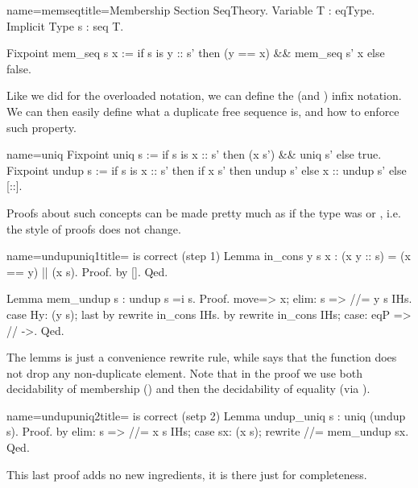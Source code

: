 \begin{coq}{name=memseq}{title=Membership}
Section SeqTheory.
Variable T : eqType.
Implicit Type s : seq T.

Fixpoint mem_seq s x :=
  if s is y :: s' then (y == x) && mem_seq s' x else false.
\end{coq}

Like we did for the overloaded \C{==} notation, we can define the
\C{\\in} (and \C{\\notin}) infix notation.  We can then easily
define what a duplicate free sequence is, and how to enforce such
property.

\begin{coq}{name=uniq}{}
Fixpoint uniq s :=
  if s is x :: s' then (x \notin s') && uniq s' else true.
Fixpoint undup s :=
  if s is x :: s' then
    if x \in s' then undup s' else x :: undup s'
  else [::].
\end{coq}

Proofs about such concepts can be made pretty much as if
the type  was  or , i.e. the style of proofs
does not change.

\begin{coq}{name=undupuniq1}{title= is correct (step 1)}
Lemma in_cons y s x : (x \in y :: s) = (x == y) || (x \in s).
Proof. by []. Qed.

Lemma mem_undup s : undup s =i s.
Proof.
move=> x; elim: s => //= y s IHs.
case Hy: (y \in s); last by rewrite in_cons IHs.
by rewrite in_cons IHs; case: eqP => // ->.
Qed.
\end{coq}

The  lemms is just a convenience rewrite rule, while
 says that the  function does not drop
any non-duplicate element.  Note that in the proof we use both
decidability of membership () and then the decidability of
equality (via ).

\begin{coq}{name=undupuniq2}{title= is correct (setp 2)}
Lemma undup_uniq s : uniq (undup s).
Proof.
by elim: s => //= x s IHs; case sx: (x \in s); rewrite //= mem_undup sx.
Qed.
\end{coq}

This last proof adds no new ingredients, it is there just for
completeness.

